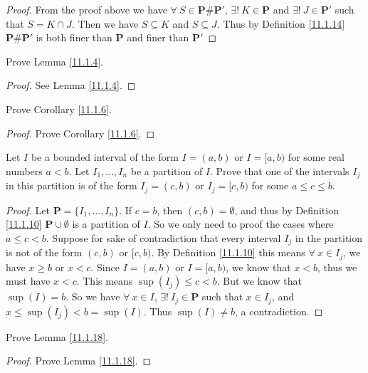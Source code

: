 \begin{proof}
    From the proof above we have \(\forall\ S \in \mathbf{P} \# \mathbf{P}'\), \(\exists!\ K \in \mathbf{P}\) and \(\exists!\ J \in \mathbf{P}'\) such that \(S = K \cap J\).
    Then we have \(S \subseteq K\) and \(S \subseteq J\).
    Thus by Definition \ref{11.1.14} \(\mathbf{P} \# \mathbf{P}'\) is both finer than \(\mathbf{P}\) and finer than \(\mathbf{P}'\)
\end{proof}

\exercisesection

\begin{exercise}\label{ex 11.1.1}
    Prove Lemma \ref{11.1.4}.
\end{exercise}

\begin{proof}
    See Lemma \ref{11.1.4}.
\end{proof}

\begin{exercise}\label{ex 11.1.2}
    Prove Corollary \ref{11.1.6}.
\end{exercise}

\begin{proof}
    Prove Corollary \ref{11.1.6}.
\end{proof}

\begin{exercise}\label{ex 11.1.3}
    Let \(I\) be a bounded interval of the form \(I = (a, b)\) or \(I = [a, b)\) for some real numbers \(a < b\).
    Let \(I_1, \dots, I_n\) be a partition of \(I\).
    Prove that one of the intervals \(I_j\) in this partition is of the form \(I_j = (c, b)\) or \(I_j = [c, b)\) for some \(a \leq c \leq b\).
\end{exercise}

\begin{proof}
    Let \(\mathbf{P} = \{I_1, \dots, I_n\}\).
    If \(c = b\), then \((c, b) = \emptyset\), and thus by Definition \ref{11.1.10} \(\mathbf{P} \cup \emptyset\) is a partition of \(I\).
    So we only need to proof the cases where \(a \leq c < b\).
    Suppose for sake of contradiction that every interval \(I_j\) in the partition is not of the form \((c, b)\) or \([c, b)\).
    By Definition \ref{11.1.10} this means \(\forall\ x \in I_j\), we have \(x \geq b\) or \(x < c\).
    Since \(I = (a, b)\) or \(I = [a, b)\), we know that \(x < b\), thus we must have \(x < c\).
    This means \(\sup(I_j) \leq c < b\).
    But we know that \(\sup(I) = b\).
    So we have \(\forall\ x \in I\), \(\exists!\ I_j \in \mathbf{P}\) such that \(x \in I_j\), and \(x \leq \sup(I_j) < b = \sup(I)\).
    Thus \(\sup(I) \neq b\), a contradiction.
\end{proof}

\begin{exercise}\label{ex 11.1.4}
    Prove Lemma \ref{11.1.18}.
\end{exercise}

\begin{proof}
    Prove Lemma \ref{11.1.18}.
\end{proof}